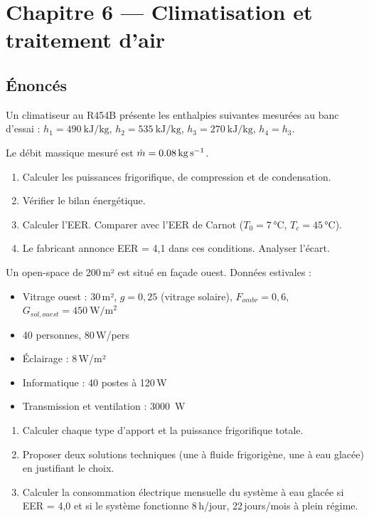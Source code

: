 \chapter*{Chapitre 6 — Climatisation et traitement d'air}

\section*{Énoncés}


Un climatiseur au R454B présente les enthalpies suivantes mesurées au banc d'essai :
$h_1 = \SI{490}{\kilo\joule\per\kilogram}$, $h_2 = \SI{535}{\kilo\joule\per\kilogram}$, $h_3 = \SI{270}{\kilo\joule\per\kilogram}$, $h_4 = h_3$.

Le débit massique mesuré est $\dot{m} = \SI{0{,}08}{\kilogram\per\second}$.

\begin{enumerate}
  \item Calculer les puissances frigorifique, de compression et de condensation.
  \item Vérifier le bilan énergétique.
  \item Calculer l'EER. Comparer avec l'EER de Carnot ($T_{0} = 7$\,°C, $T_{c} = 45$\,°C).
  \item Le fabricant annonce EER = 4,1 dans ces conditions. Analyser l'écart.
\end{enumerate}


Un open-space de 200\,m² est situé en façade ouest. Données estivales :
\begin{itemize}
  \item Vitrage ouest : 30\,m², $g = 0{,}25$ (vitrage solaire), $F_{ombr} = 0{,}6$, $G_{sol,ouest} = \SI{450}{\watt\per\square\metre}$
  \item 40 personnes, 80\,W/pers
  \item Éclairage : 8\,W/m²
  \item Informatique : 40 postes à 120\,W
  \item Transmission et ventilation : \SI{3000}{\watt}
\end{itemize}

\begin{enumerate}
  \item Calculer chaque type d'apport et la puissance frigorifique totale.
  \item Proposer deux solutions techniques (une à fluide frigorigène, une à eau glacée) en justifiant le choix.
  \item Calculer la consommation électrique mensuelle du système à eau glacée si EER = 4,0 et si le système fonctionne 8\,h/jour, 22\,jours/mois à plein régime.
\end{enumerate}


